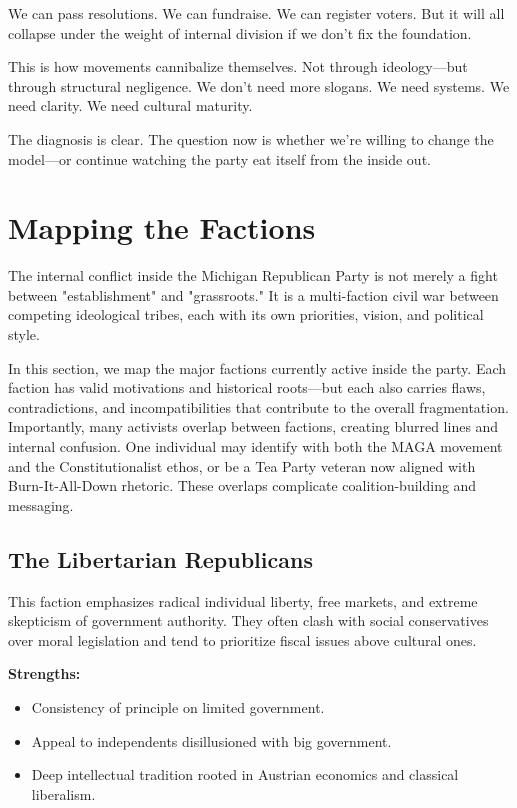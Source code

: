 We can pass resolutions. We can fundraise. We can register voters. But it will all collapse under the weight of internal division if we don’t fix the foundation.

This is how movements cannibalize themselves. Not through ideology—but through structural negligence. We don’t need more slogans. We need systems. We need clarity. We need cultural maturity.

The diagnosis is clear. The question now is whether we’re willing to change the model—or continue watching the party eat itself from the inside out.


\section{Mapping the Factions}

The internal conflict inside the Michigan Republican Party is not merely a fight between "establishment" and "grassroots." It is a multi-faction civil war between competing ideological tribes, each with its own priorities, vision, and political style.

In this section, we map the major factions currently active inside the party. Each faction has valid motivations and historical roots—but each also carries flaws, contradictions, and incompatibilities that contribute to the overall fragmentation. Importantly, many activists overlap between factions, creating blurred lines and internal confusion. One individual may identify with both the MAGA movement and the Constitutionalist ethos, or be a Tea Party veteran now aligned with Burn-It-All-Down rhetoric. These overlaps complicate coalition-building and messaging.

\subsection{The Libertarian Republicans}
This faction emphasizes radical individual liberty, free markets, and extreme skepticism of government authority. They often clash with social conservatives over moral legislation and tend to prioritize fiscal issues above cultural ones.

\textbf{Strengths:}
\begin{itemize}
\item Consistency of principle on limited government.
\item Appeal to independents disillusioned with big government.
\item Deep intellectual tradition rooted in Austrian economics and classical liberalism.
\end{itemize}

